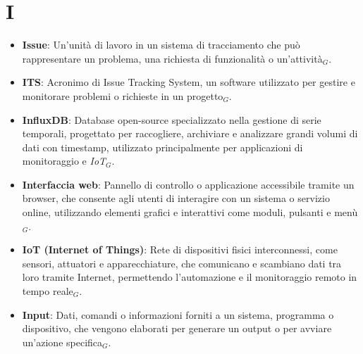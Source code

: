 \section{I}
\begin{itemize}
    \item \textbf{Issue}: Un'unità di lavoro in un sistema di tracciamento che può rappresentare un problema, una richiesta di funzionalità o un'attività$_G$.
    \item \textbf{ITS}: Acronimo di Issue Tracking System, un software utilizzato per gestire e monitorare problemi o richieste in un progetto$_G$.
    \item \textbf{InfluxDB}: Database open-source specializzato nella gestione di serie temporali, progettato per raccogliere, archiviare e analizzare grandi volumi di dati con timestamp, utilizzato principalmente per applicazioni di monitoraggio e \textit{IoT}$_G$.
    \item \textbf{Interfaccia web}: Pannello di controllo o applicazione accessibile tramite un browser, che consente agli utenti di interagire con un sistema o servizio online, utilizzando elementi grafici e interattivi come moduli, pulsanti e menù$_G$.
    \item \textbf{IoT (Internet of Things)}: Rete di dispositivi fisici interconnessi, come sensori, attuatori e apparecchiature, che comunicano e scambiano dati tra loro tramite Internet, permettendo l'automazione e il monitoraggio remoto in tempo reale$_G$.
    \item \textbf{Input}: Dati, comandi o informazioni forniti a un sistema, programma o dispositivo, che vengono elaborati per generare un output o per avviare un'azione specifica$_G$.
\end{itemize}
